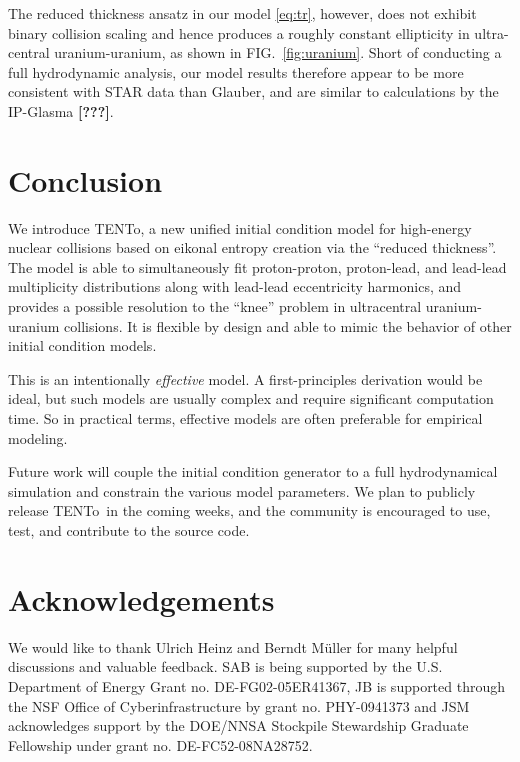 \documentclass[aps,prl,reprint,amsmath,nofootinbib]{revtex4-1}
\newcommand{\trento}{T\raisebox{-.5ex}{R}ENTo}
\newcommand{\needcite}{\textbf{[???]}}
\begin{document}
The reduced thickness ansatz in our model \eqref{eq:tr}, however, does not exhibit binary collision scaling and hence produces a roughly
constant ellipticity in ultra-central uranium-uranium, as shown in FIG.~\ref{fig:uranium}.  Short of conducting
a full hydrodynamic analysis, our model results therefore appear to be more consistent with STAR data than Glauber, and are similar to calculations by the IP-Glasma \needcite.


\section{Conclusion}

We introduce \trento, a new unified initial condition model for high-energy nuclear collisions based on
eikonal entropy creation via the ``reduced thickness''.  The model is able to simultaneously fit
proton-proton, proton-lead, and lead-lead multiplicity distributions along with lead-lead eccentricity
harmonics, and provides a possible resolution to the ``knee'' problem in ultracentral uranium-uranium
collisions.  It is flexible by design and able to mimic the behavior of other initial condition models.

This is an intentionally \emph{effective} model.  A first-principles derivation would be ideal, but such
models are usually complex and require significant computation time.  So in practical terms, effective models
are often preferable for empirical modeling.

Future work will couple the initial condition generator to a full hydrodynamical simulation and constrain the
various model parameters.  We plan to publicly release \trento\ in the coming weeks, and the community is
encouraged to use, test, and contribute to the source code.

\section*{Acknowledgements}

We would like to thank Ulrich Heinz and Berndt M\"uller for many helpful discussions and valuable feedback. 
SAB is being supported by the U.S. Department of Energy Grant no. DE-FG02-05ER41367, JB is supported through the NSF Office of Cyberinfrastructure by grant no. PHY-0941373 and JSM acknowledges support by the DOE/NNSA Stockpile Stewardship Graduate Fellowship under 
grant no. DE-FC52-08NA28752.


\end{document}
